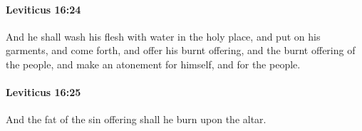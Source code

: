 		\paragraph{Leviticus 16:24} %
			\label{LEVITICUS-16-24}

			And he shall wash his flesh with water in the holy place, and put on his garments, and come forth, and offer his burnt offering, and the burnt offering of the people, and make an atonement for himself, and for the people.


		\paragraph{Leviticus 16:25} %
			\label{LEVITICUS-16-25}

			And the fat of the sin offering shall he burn upon the altar.


